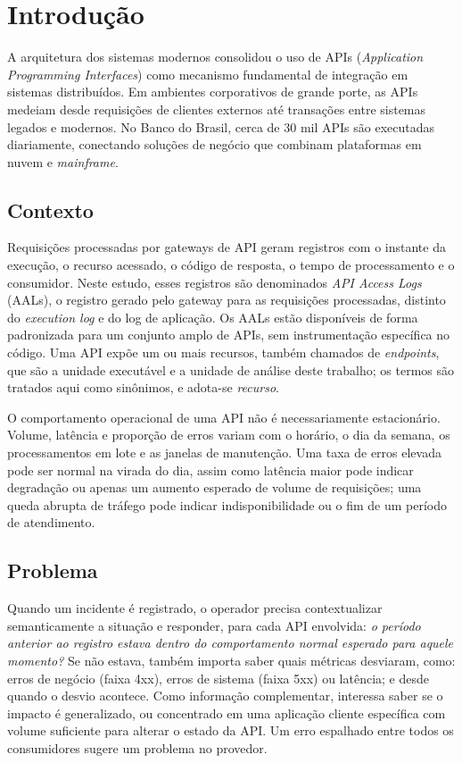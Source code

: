 \documentclass[sigconf,nonacm]{acmart}
\begin{document}
\section{Introdução}

A arquitetura dos sistemas modernos consolidou o uso de APIs (\emph{Application Programming Interfaces}) como mecanismo fundamental de integração em sistemas distribuídos. Em ambientes corporativos de grande porte, as APIs medeiam desde requisições de clientes externos até transações entre sistemas legados e modernos. No Banco do Brasil, cerca de 30 mil APIs são executadas diariamente, conectando soluções de negócio que combinam plataformas em nuvem e \emph{mainframe}.

\subsection{Contexto}

Requisições processadas por gateways de API geram registros com o instante da execução, o recurso acessado, o código de resposta, o tempo de processamento e o consumidor. Neste estudo, esses registros são denominados \emph{API Access Logs} (AALs), o registro gerado pelo gateway para as requisições processadas, distinto do \emph{execution log} e do log de aplicação. Os AALs estão disponíveis de forma padronizada para um conjunto amplo de APIs, sem instrumentação específica no código. Uma API expõe um ou mais recursos, também chamados de \emph{endpoints}, que são a unidade executável e a unidade de análise deste trabalho; os termos são tratados aqui como sinônimos, e adota-se \emph{recurso}.

O comportamento operacional de uma API não é necessariamente estacionário. Volume, latência e proporção de erros variam com o horário, o dia da semana, os processamentos em lote e as janelas de manutenção. Uma taxa de erros elevada pode ser normal na virada do dia, assim como latência maior pode indicar degradação ou apenas um aumento esperado de volume de requisições; uma queda abrupta de tráfego pode indicar indisponibilidade ou o fim de um período de atendimento.

\subsection{Problema}
Quando um incidente é registrado, o operador precisa contextualizar semanticamente a situação e responder, para cada API envolvida: \emph{o período anterior ao registro estava dentro do comportamento normal esperado para aquele momento?} Se não estava, também importa saber quais métricas desviaram, como: erros de negócio (faixa 4xx), erros de sistema (faixa 5xx) ou latência; e desde quando o desvio acontece. Como informação complementar, interessa saber se o impacto é generalizado, ou concentrado em uma aplicação cliente específica com volume suficiente para alterar o estado da API. Um erro espalhado entre todos os consumidores sugere um problema no provedor.
\end{document}
